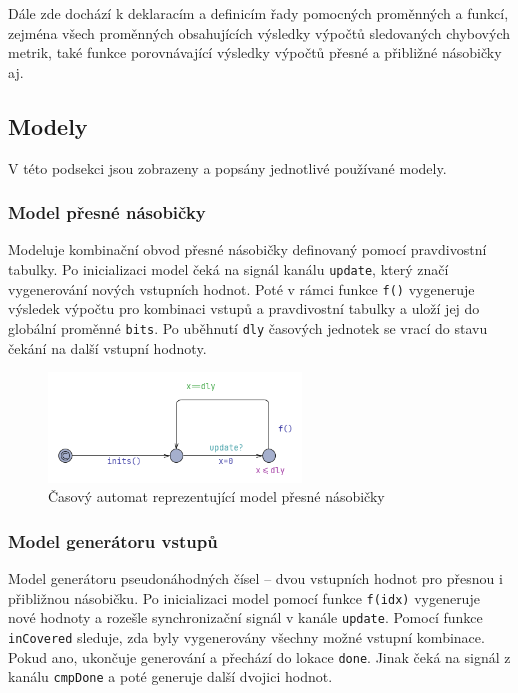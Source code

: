 Dále zde dochází k deklaracím a definicím řady pomocných proměnných a funkcí, zejména všech proměnných obsahujících výsledky výpočtů sledovaných chybových metrik, také funkce porovnávající výsledky výpočtů přesné a přibližné násobičky aj.

\subsection{Modely}
V této podsekci jsou zobrazeny a popsány jednotlivé používané modely.

\subsubsection{Model přesné násobičky}
Modeluje kombinační obvod přesné násobičky definovaný pomocí pravdivostní tabulky. Po inicializaci model čeká na signál kanálu \texttt{update}, který značí vygenerování nových vstupních hodnot. Poté v rámci funkce \texttt{f()} vygeneruje výsledek výpočtu pro kombinaci vstupů a pravdivostní tabulky a uloží jej do globální proměnné \texttt{bits}. Po uběhnutí \texttt{dly} časových jednotek se vrací do stavu čekání na další vstupní hodnoty.

\begin{figure}[H]
    \centering
    \includegraphics[width=0.6\textwidth]{obrazky-figures/model_tmul2any.png}
    \caption{Časový automat reprezentující model přesné násobičky}
    \label{fig:model_tmul2any}
\end{figure}

\subsubsection{Model generátoru vstupů}
Model generátoru pseudonáhodných čísel -- dvou vstupních hodnot pro přesnou i přibližnou násobičku. Po inicializaci model pomocí funkce \texttt{f(idx)} vygeneruje nové hodnoty a rozešle synchronizační signál v kanále \texttt{update}. Pomocí funkce \texttt{inCovered} sleduje, zda byly vygenerovány všechny možné vstupní kombinace. Pokud ano, ukončuje generování a přechází do lokace \texttt{done}. Jinak čeká na signál z kanálu \texttt{cmpDone} a poté generuje další dvojici hodnot.

